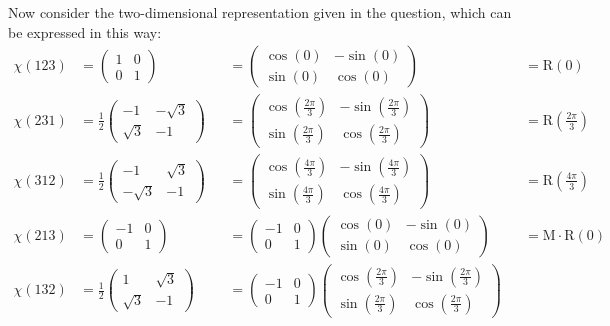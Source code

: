 \documentclass[12pt]{extarticle}
\begin{document}
Now consider the two-dimensional representation given in the question,
which can be expressed in this way:
\begin{align*}
\chi(123)
& = \begin{pmatrix} 1 & 0 \\  0 & 1 \end{pmatrix}
&& = \begin{pmatrix} \cos(0) & -\sin(0) \\ \sin(0) & \cos(0) \end{pmatrix}
&& = \text{R}(0) \\
\chi(231)
& = \frac{1}{2} \begin{pmatrix} -1 & -\sqrt{3} \\ \sqrt{3} & -1 \end{pmatrix}
&& = \begin{pmatrix} \cos(\frac{2\pi}{3}) & -\sin(\frac{2\pi}{3}) \\ \sin(\frac{2\pi}{3}) & \cos(\frac{2\pi}{3}) \end{pmatrix}
&& = \text{R}(\frac{2\pi}{3}) \\
\chi(312) & = \frac{1}{2} \begin{pmatrix} -1 & \sqrt{3} \\ -\sqrt{3} & -1 \end{pmatrix}
&& = \begin{pmatrix} \cos(\frac{4\pi}{3}) & -\sin(\frac{4\pi}{3}) \\ \sin(\frac{4\pi}{3}) & \cos(\frac{4\pi}{3}) \end{pmatrix}
&& = \text{R}(\frac{4\pi}{3}) \\
\chi(213) & = \begin{pmatrix} -1 & 0 \\ 0 & 1 \end{pmatrix}
&& = \begin{pmatrix}-1 & 0 \\ 0 & 1\end{pmatrix} \begin{pmatrix} \cos(0) & -\sin(0) \\ \sin(0) & \cos(0) \end{pmatrix}
&& = \text{M} \cdot \text{R}(0) \\
\chi(132) & = \frac{1}{2} \begin{pmatrix} 1 & \sqrt{3} \\ \sqrt{3} & -1 \end{pmatrix}
&& = \begin{pmatrix}-1 & 0 \\ 0 & 1\end{pmatrix} \begin{pmatrix} \cos(\frac{2\pi}{3}) & -\sin(\frac{2\pi}{3}) \\ \sin(\frac{2\pi}{3}) & \cos(\frac{2\pi}{3}) \end{pmatrix}

\end{align*}
\end{document}
